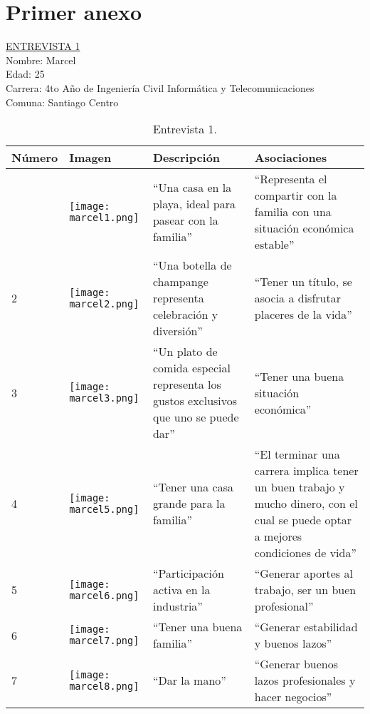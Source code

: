 \chapter{Primer anexo}
\label{ch:anexo-a}
\newpage
\underline {ENTREVISTA 1} \\
Nombre: Marcel\\
Edad: 25\\
Carrera: 4to Año de Ingeniería Civil Informática y Telecomunicaciones\\
Comuna: Santiago Centro \\

\begin{table}[H]
\centering
\begin{tabular}{>{\centering\arraybackslash}m{1cm} >{\centering\arraybackslash}m{2cm} >{\arraybackslash}m{5cm}>{\arraybackslash}m{5cm}}
\hline
Número & Imagen & Descripción & Asociaciones \\
\hline \hline

1 & \texttt{[image: marcel1.png]} & ``Una casa en la playa, ideal para pasear con la familia'' & ``Representa el compartir con la familia con una situación económica estable'' \\
\hline

2 & \texttt{[image: marcel2.png]} & ``Una botella de champange representa celebración y diversión'' & ``Tener un título, se asocia a disfrutar placeres de la vida'' \\
\hline

3 & \texttt{[image: marcel3.png]} & ``Un plato de comida especial representa los gustos exclusivos que uno se puede dar'' & ``Tener una buena situación económica'' \\
\hline

4 & \texttt{[image: marcel5.png]} & ``Tener una casa grande para la familia''  & ``El terminar una carrera implica tener un buen trabajo y mucho dinero, con el cual se puede optar a mejores condiciones de vida'' \\
\hline

5 & \texttt{[image: marcel6.png]} & ``Participación activa en la industria'' & ``Generar aportes al trabajo, ser un buen profesional'' \\
\hline

6 & \texttt{[image: marcel7.png]} & ``Tener una buena familia'' & ``Generar estabilidad y buenos lazos'' \\
\hline

7 & \texttt{[image: marcel8.png]} & ``Dar la mano'' &  ``Generar buenos lazos profesionales y hacer negocios'' \\
\hline

\end{tabular}
\caption{Entrevista 1.}
\label{tabla:marcel}
\end{table}

